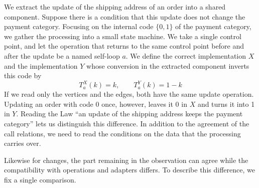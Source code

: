 \begin{example}\label{ex:7.1}

We extract the update of the shipping address of an order into a shared component.
Suppose there is a condition that this update does not change the payment category.
Focusing on the internal code $\{0,1\}$ of the payment category, we gather the processing
into a small state machine.
We take a single control point, and let the operation that returns to the same control point
before and after the update be a named self-loop $a$.
We define the correct implementation $X$ and the implementation $Y$ whose conversion in the
extracted component inverts this code by
\begin{equation*}
T_a^X(k)=k,\qquad T_a^Y(k)=1-k
\tag{7.1}\label{eq:7.1}
\end{equation*}
If we read only the vertices and the edges, both have the same update operation.
Updating an order with code 0 once, however, leaves it 0 in $X$ and turns it into 1 in $Y$.
Reading the Law ``an update of the shipping address keeps the payment category'' lets us
distinguish this difference.
In addition to the agreement of the call relations, we need to read the conditions on the
data that the processing carries over.

Likewise for changes, the part remaining in the observation can agree while the
compatibility with operations and adapters differs.
To describe this difference, we fix a single comparison.

\end{example}

